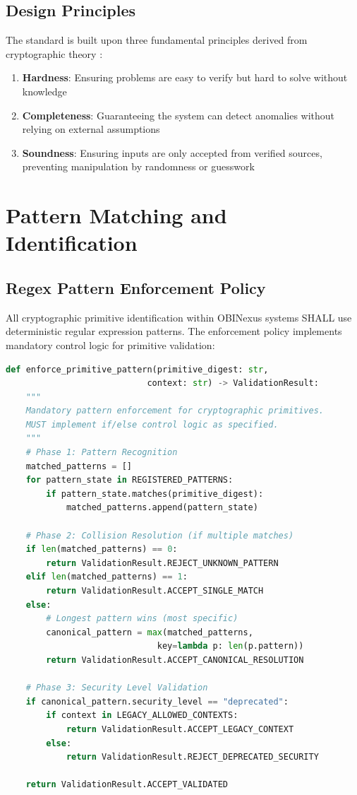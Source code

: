 \documentclass[11pt,a4paper]{article}
\begin{document}
\subsection{Design Principles}

The standard is built upon three fundamental principles derived from cryptographic theory \cite{okpala2025principles}:

\begin{enumerate}
    \item \textbf{Hardness}: Ensuring problems are easy to verify but hard to solve without knowledge
    \item \textbf{Completeness}: Guaranteeing the system can detect anomalies without relying on external assumptions
    \item \textbf{Soundness}: Ensuring inputs are only accepted from verified sources, preventing manipulation by randomness or guesswork
\end{enumerate}

\section{Pattern Matching and Identification}

\subsection{Regex Pattern Enforcement Policy}

All cryptographic primitive identification within OBINexus systems SHALL use deterministic regular expression patterns. The enforcement policy implements mandatory control logic for primitive validation:

\begin{lstlisting}[language=Python, caption=Mandatory Pattern Enforcement Logic]
def enforce_primitive_pattern(primitive_digest: str, 
                            context: str) -> ValidationResult:
    """
    Mandatory pattern enforcement for cryptographic primitives.
    MUST implement if/else control logic as specified.
    """
    # Phase 1: Pattern Recognition
    matched_patterns = []
    for pattern_state in REGISTERED_PATTERNS:
        if pattern_state.matches(primitive_digest):
            matched_patterns.append(pattern_state)
    
    # Phase 2: Collision Resolution (if multiple matches)
    if len(matched_patterns) == 0:
        return ValidationResult.REJECT_UNKNOWN_PATTERN
    elif len(matched_patterns) == 1:
        return ValidationResult.ACCEPT_SINGLE_MATCH
    else:
        # Longest pattern wins (most specific)
        canonical_pattern = max(matched_patterns, 
                              key=lambda p: len(p.pattern))
        return ValidationResult.ACCEPT_CANONICAL_RESOLUTION
    
    # Phase 3: Security Level Validation
    if canonical_pattern.security_level == "deprecated":
        if context in LEGACY_ALLOWED_CONTEXTS:
            return ValidationResult.ACCEPT_LEGACY_CONTEXT
        else:
            return ValidationResult.REJECT_DEPRECATED_SECURITY
    
    return ValidationResult.ACCEPT_VALIDATED
\end{lstlisting}
\end{document}
